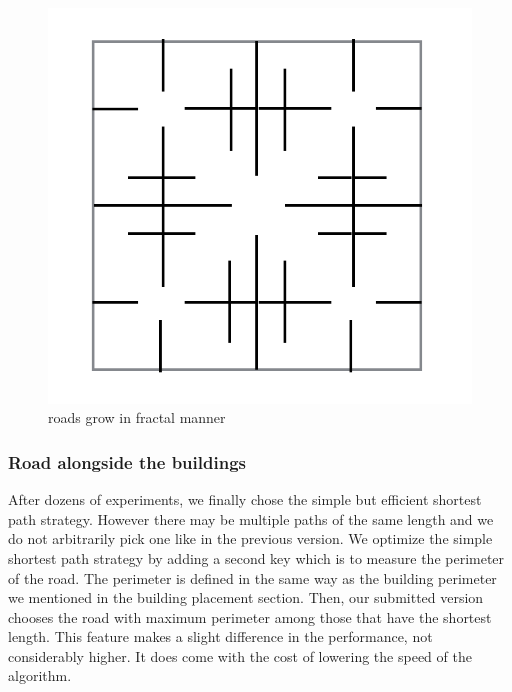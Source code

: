 \begin{figure}
\center
\includegraphics[scale=0.5]{prebuildRoad.png}
\caption{roads grow in fractal manner}
\label{fig: prebuildRoad}
\end{figure}

\subsubsection{Road alongside the buildings}
After dozens of experiments, we finally chose the simple but efficient shortest path strategy. However there may be multiple paths of the same length and we do not arbitrarily pick one like in the previous version. We optimize the simple shortest path strategy by adding a second key which is to measure the perimeter of the road. The perimeter is defined in the same way as the building perimeter we mentioned in the building placement section. Then, our submitted version chooses the road with maximum perimeter among those that have the shortest length. This feature makes a slight difference in the performance, not considerably higher. It does come with the cost of lowering the speed of the algorithm.
